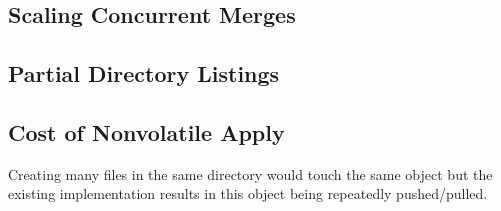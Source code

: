 \subsection{Scaling Concurrent Merges}

\subsection{Partial Directory Listings}

\subsection{Cost of Nonvolatile Apply}
Creating many files in the same directory would touch the same object but the
existing implementation results in this object being repeatedly pushed/pulled.



